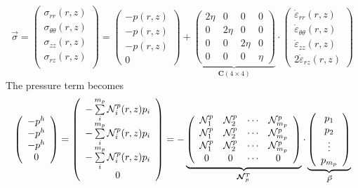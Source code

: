 \[
\vec{\sigma}=
\left(
\begin{array}{c}
\sigma_{rr}(r,z) \\
\sigma_{\theta\theta}(r,z) \\
\sigma_{zz}(r,z) \\
\sigma_{rz}(r,z) \\
\end{array}
\right)
=
\left(
\begin{array}{c}
-p(r,z) \\ -p(r,z) \\ -p(r,z) \\ 0
\end{array}
\right)+
\underbrace{
\left(
\begin{array}{cccc}
2\eta & 0 & 0 & 0  \\
0& 2\eta & 0& 0  \\
0 & 0 & 2\eta & 0  \\
0 & 0 & 0 & \eta
\end{array}
\right)
}_{{\bm C}(4 \times 4)}
\cdot
\left(
\begin{array}{c}
\dot\varepsilon_{rr}(r,z) \\
\dot\varepsilon_{\theta\theta}(r,z) \\
\dot\varepsilon_{zz}(r,z) \\
2\dot\varepsilon_{rz}(r,z) 
\end{array}
\right)
\]
The pressure term becomes
\begin{equation}
\left(
\begin{array}{c}
-p^h \\ -p^h \\ -p^h \\ 0
\end{array}
\right)
=
\left(
\begin{array}{c}
-\sum\limits_i^{m_p} {\mathcal{N}}_i^p(r,z) p_i \\
-\sum\limits_i^{m_p} {\mathcal{N}}_i^p(r,z) p_i \\ 
-\sum\limits_i^{m_p} {\mathcal{N}}_i^p(r,z) p_i \\ 
0
\end{array}
\right)
=
-
\underbrace{
\left(
\begin{array}{cccc}
{\mathcal{N}}_1^p & {\mathcal{N}}_2^p & \cdots & {\mathcal{N}}_{m_p}^p \\
{\mathcal{N}}_1^p & {\mathcal{N}}_2^p & \cdots & {\mathcal{N}}_{m_p}^p \\
{\mathcal{N}}_1^p & {\mathcal{N}}_2^p & \cdots & {\mathcal{N}}_{m_p}^p \\
0 & 0 & \cdots & 0
\end{array}
\right)
}_{{\bm {{\mathcal{N}}}}_p^T}
\cdot
\underbrace{
\left(
\begin{array}{c}
p_1 \\ p_2 \\ \vdots \\ p_{m_p}
\end{array}
\right)
}_{\vec{P}}
\end{equation}
